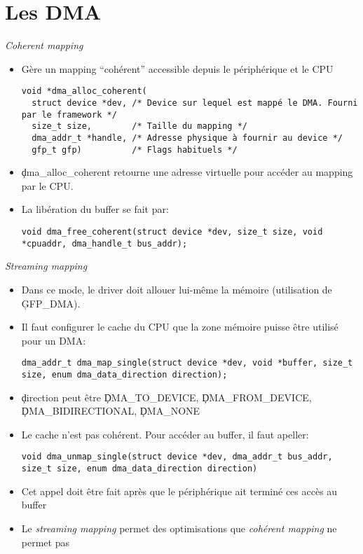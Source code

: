 \section{Les DMA}

\begin{frame}[fragile=singleslide]{\emph{Coherent mapping}}
  \begin{itemize}
  \item Gère un mapping ``cohérent'' accessible depuis le périphérique et le
    CPU
    \begin{lstlisting}
void *dma_alloc_coherent(
  struct device *dev, /* Device sur lequel est mappé le DMA. Fourni par le framework */
  size_t size,        /* Taille du mapping */
  dma_addr_t *handle, /* Adresse physique à fournir au device */
  gfp_t gfp)          /* Flags habituels */
    \end{lstlisting}
  \item  \c{dma_alloc_coherent} retourne  une adresse  virtuelle pour
    accéder au mapping par le CPU.
  \item La libération du buffer se fait par:
    \begin{lstlisting}
void dma_free_coherent(struct device *dev, size_t size, void *cpuaddr, dma_handle_t bus_addr);
    \end{lstlisting}
  \end{itemize}
\end{frame}

\begin{frame}[fragile=singleslide]{\emph{Streaming mapping}}
  \begin{itemize}
  \item  Dans ce  mode, le  driver  doit allouer  lui-même la  mémoire
    (utilisation de \c{GFP_DMA}).
  \item Il faut configurer le cache  du CPU que la zone mémoire puisse
    être utilisé pour un DMA:
    \begin{lstlisting}
dma_addr_t dma_map_single(struct device *dev, void *buffer, size_t size, enum dma_data_direction direction);
    \end{lstlisting}
  \item \c{direction} peut être \c{DMA_TO_DEVICE},
    \c{DMA_FROM_DEVICE}, \c{DMA_BIDIRECTIONAL}, \c{DMA_NONE}
  \item Le cache  n'est pas cohérent. Pour accéder  au buffer, il faut
    apeller:
    \begin{lstlisting}
void dma_unmap_single(struct device *dev, dma_addr_t bus_addr, size_t size, enum dma_data_direction direction)
    \end{lstlisting}
  \item Cet appel doit être fait après que le périphérique ait terminé
    ces accès au buffer
  \item  Le  \emph{streaming  mapping}  permet des  optimisations  que
    \emph{cohérent mapping} ne permet pas
  \end{itemize}
\end{frame}

